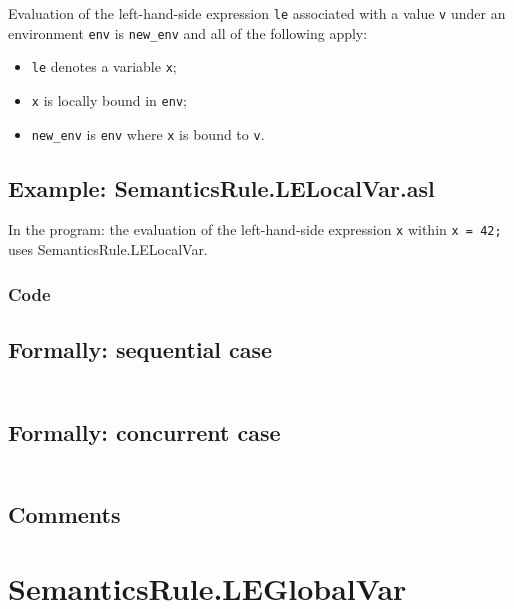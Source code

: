 \documentclass{book}
\begin{document}
    Evaluation of the left-hand-side expression \texttt{le} associated with a
value \texttt{v} under an environment \texttt{env} is \texttt{new\_env} and all
of the following apply:
    \begin{itemize}
    \item \texttt{le} denotes a variable \texttt{x};
    \item \texttt{x} is locally bound in \texttt{env};
    \item \texttt{new\_env} is \texttt{env} where \texttt{x} is bound to \texttt{v}.
    \end{itemize}

    \subsection{Example: SemanticsRule.LELocalVar.asl}
    In the program:
    the evaluation of the left-hand-side expression \texttt{x} within \texttt{x = 42;} uses SemanticsRule.LELocalVar.

  \subsubsection{Code}

  \subsection{Formally: sequential case}
  \begin{align}
  \end{align} 

  \subsection{Formally: concurrent case}
  \begin{align}
  \end{align} 

  \subsection{Comments}

\section{SemanticsRule.LEGlobalVar \label{sec:SemanticsRule.LEGlobalVar}}
\end{document}
